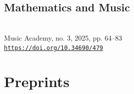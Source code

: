 \documentclass[11pt,letterpaper]{report}
\begin{document}
    \subsection*{Mathematics and Music}
        
        \begin{tablist}
        
        \item[Sep. 2025] \\ Music Academy, no. 3, 2025, pp. 64–83 \\ \href{https://doi.org/10.34690/479}{\tt https://doi.org/10.34690/479}
        
        \end{tablist}
        
    
          \section*{Preprints}
          
\end{document}
